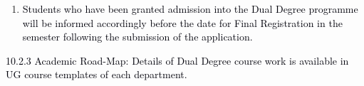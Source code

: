 \documentclass[12pt]{article}
\begin{document}
\begin{enumerate}
\vspace{\baselineskip}
	\item {\fontsize{10pt}{12.0pt}\selectfont \textcolor[HTML]{00000A}{Students who have been granted admission into the Dual Degree programme will be informed accordingly before the date for Final Registration in the semester following the submission of the application.}\par}
\end{enumerate}\par


\vspace{\baselineskip}

\vspace{\baselineskip}

\vspace{\baselineskip}

\vspace{\baselineskip}

\vspace{\baselineskip}

\vspace{\baselineskip}
{\fontsize{9pt}{10.8pt}\selectfont \textcolor[HTML]{00000A}{10.2.3 Academic Road-Map: Details of Dual Degree course work is available in UG course templates of each department.}\par}\par
\end{document}
